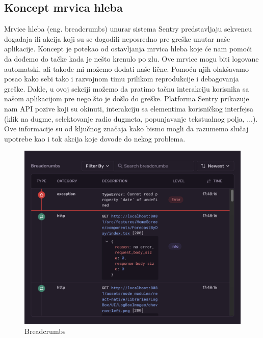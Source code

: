 \documentclass[12pt,oneside]{memoir}
\begin{document}
\subsection{Koncept mrvica hleba}

Mrvice hleba (eng. breadcrumbs) unurar sistema Sentry predstavljaju sekvencu događaja ili akcija koji su se dogodili neposredno pre greške unutar naše aplikacije. Koncept je potekao od ostavljanja mrvica hleba koje će nam pomoći da dođemo do tačke kada je nešto krenulo po zlu. Ove mrvice mogu biti logovane automatski, ali takođe mi možemo dodati naše lične. Pomoću njih olakšavamo posao kako sebi tako i razvojnom timu prilikom reprodukcije i debagovanja greške. Dakle, u ovoj sekciji možemo da pratimo tačnu interakciju korisnika sa našom aplikacijom pre nego što je došlo do greške. Platforma Sentry prikazuje nam API pozive koji su okinuti, interakciju sa elementima korisničkog interfejsa (klik na dugme, selektovanje radio dugmeta, popunjavanje tekstualnog polja, ...). Ove informacije su od ključnog značaja kako bismo mogli da razumemo slučaj upotrebe kao i tok akcija koje dovode do nekog problema. \newline

\newline

\begin{figure}[h!]
\centering
\includegraphics[scale=0.4]{docs/images/chapterSeven/SentryBreadcrumbs.png}
\caption{Breadcrumbs}
\label{fig:sentryBreadcrumbs}
\end{figure}
\end{document}
